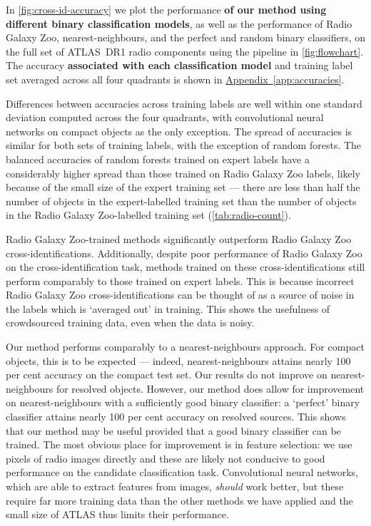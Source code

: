 \documentclass[fleqn,usenatbib,usedcolumn]{mnras}
\newcommand{\edited}[1]{{\bf {#1}}}
\newcommand{\aref}[1]{\hyperref[#1]{Appendix~\ref{#1}}}
\begin{document}
    In \autoref{fig:cross-id-accuracy} we plot the performance \edited{of our
    method using different binary classification models}, as well as the
    performance of Radio Galaxy Zoo, nearest-neighbours, and the perfect and
    random binary classifiers, on the full set of ATLAS~DR1 radio components
    using the pipeline in \autoref{fig:flowchart}. The accuracy
    \edited{associated with each classification model} and training label set
    averaged across all four quadrants is shown in \aref{app:accuracies}.

    Differences between accuracies across training labels are well within one
    standard deviation computed across the four quadrants, with convolutional
    neural networks on compact objects as the only exception. The spread of
    accuracies is similar for both sets of training labels, with the exception
    of random forests. The balanced accuracies of random forests trained on
    expert labels have a considerably higher spread than those trained on
    Radio Galaxy Zoo labels, likely because of the small size of the expert
    training set --- there are less than half the number of objects in the
    expert-labelled training set than the number of objects in the Radio
    Galaxy Zoo-labelled training set (\autoref{tab:radio-count}).

    Radio Galaxy Zoo-trained methods significantly outperform Radio Galaxy Zoo
    cross-identifications. Additionally, despite poor performance of Radio
    Galaxy Zoo on the cross-identification task, methods trained on these
    cross-identifications still perform comparably to those trained on expert
    labels. This is because incorrect Radio Galaxy Zoo cross-identifications
    can be thought of as a source of noise in the labels which is `averaged out'
    in training. This shows the usefulness of crowdsourced training data, even
    when the data is noisy.

    Our method performs comparably to a nearest-neighbours approach. For
    compact objects, this is to be expected --- indeed, nearest-neighbours
    attains nearly 100 per cent accuracy on the compact test set. Our results
    do not improve on nearest-neighbours for resolved objects. However, our
    method does allow for improvement on nearest-neighbours with a
    sufficiently good binary classifier: a `perfect' binary classifier attains
    nearly 100 per cent accuracy on resolved sources. This shows that our
    method may be useful provided that a good binary classifier can be
    trained. The most obvious place for improvement is in feature selection:
    we use pixels of radio images directly and these are likely not conducive
    to good performance on the candidate classification task. Convolutional
    neural networks, which are able to extract features from images,
    \emph{should} work better, but these require far more training data than
    the other methods we have applied and the small size of ATLAS thus limits their performance.
\end{document}
